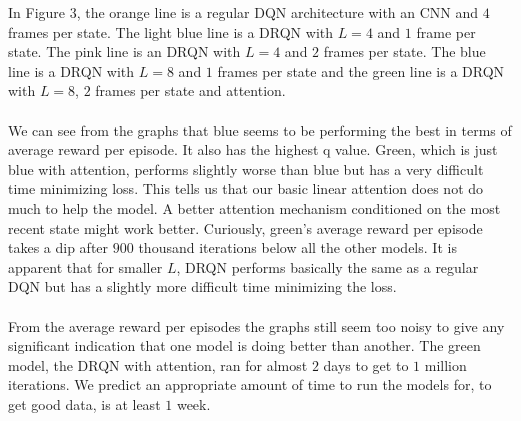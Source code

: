 \documentclass{article}
\begin{document}
In Figure 3, the orange line is a regular DQN architecture with an CNN and $4$
frames per state. The light blue line is a DRQN with $L=4$ and $1$ frame per state.
The pink line is an DRQN with $L=4$ and $2$ frames per state. The blue line is a
DRQN with $L=8$ and $1$ frames per state and the green line is a DRQN with $L=8$,
$2$ frames per state and attention. \\
\\
We can see from the graphs that blue seems to be performing the best in terms of
average reward per episode. It also has the highest q value. Green, which is just
blue with attention, performs slightly worse than blue but has a very difficult
time minimizing loss. This tells us that our basic linear attention does not do
much to help the model. A better attention mechanism conditioned on the most recent
state might work better. Curiously, green's average reward per episode takes a
dip after $900$ thousand iterations below all the other models. It is apparent
that for smaller $L$, DRQN performs basically the same as a regular DQN but has a
slightly more difficult time minimizing the loss. \\
\\
From the average reward per episodes the graphs still seem too noisy to give any
significant indication that one model is doing better than another. The green model, the DRQN with attention, ran for almost $2$ days to get
to $1$ million iterations. We predict an appropriate amount of time to run the
models for, to get good data, is at least $1$ week.
\end{document}
